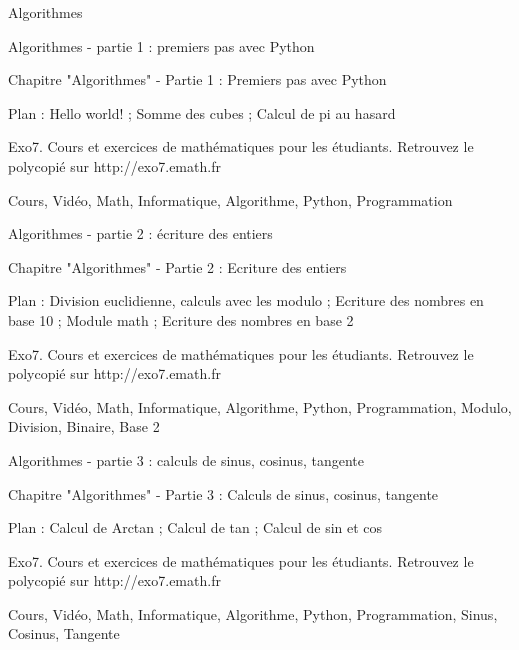 
   Algorithmes

Algorithmes - partie 1 : premiers pas avec Python



Chapitre "Algorithmes" - Partie 1 : Premiers pas avec Python

Plan : Hello world! ; Somme des cubes ; Calcul de pi au hasard

Exo7. Cours et exercices de mathématiques pour les étudiants.
Retrouvez le polycopié sur http://exo7.emath.fr


Cours, Vidéo, Math, Informatique, Algorithme, Python, Programmation 


Algorithmes - partie 2 : écriture des entiers



Chapitre "Algorithmes" - Partie 2 : Ecriture des entiers

Plan : Division euclidienne, calculs avec les modulo ; Ecriture des nombres en base 10 ; Module math ; Ecriture des nombres en base 2

Exo7. Cours et exercices de mathématiques pour les étudiants.
Retrouvez le polycopié sur http://exo7.emath.fr


Cours, Vidéo, Math, Informatique, Algorithme, Python, Programmation, Modulo, Division, Binaire, Base 2




Algorithmes - partie 3 : calculs de sinus, cosinus, tangente



Chapitre "Algorithmes" - Partie 3 : Calculs de sinus, cosinus, tangente

Plan : Calcul de Arctan ; Calcul de tan ; Calcul de sin et cos

Exo7. Cours et exercices de mathématiques pour les étudiants.
Retrouvez le polycopié sur http://exo7.emath.fr


Cours, Vidéo, Math, Informatique, Algorithme, Python, Programmation, Sinus, Cosinus, Tangente




